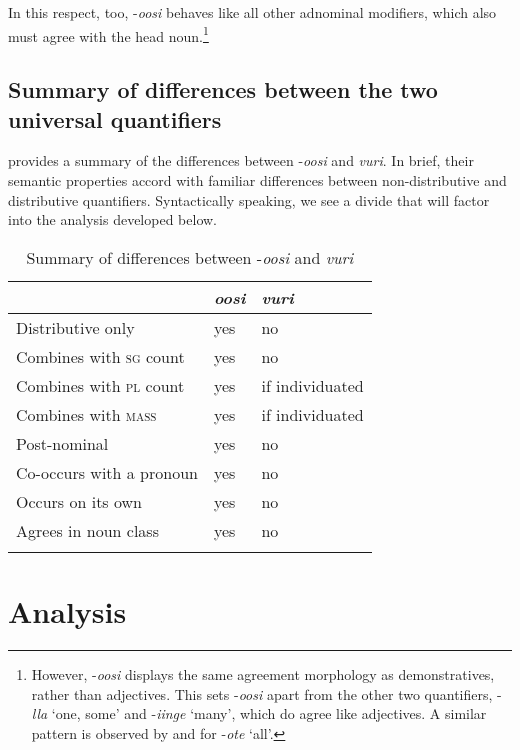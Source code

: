 \documentclass[output=paper]{langsci/langscibook}
\begin{document}
In this respect, too, -\textit{oosi} behaves like all other adnominal modifiers, which also must agree with the head noun.\footnote{However, -\textit{oosi} displays the same agreement morphology as demonstratives, rather than adjectives. This sets -\textit{oosi} apart from the other two  quantifiers, -\textit{lla} ‘one, some’ and -\textit{iinge} ‘many’, which do agree like adjectives. A similar pattern is observed by \citet{Krifka1995} and \citet{ZerbianKrifka2008} for  -\textit{ote} ‘all’.
} 

\subsection{Summary of differences between the two universal quantifiers}

 provides a summary of the differences between -\textit{oosi} and \textit{vuri}. In brief, their semantic properties accord with familiar differences between non-distributive and distributive quantifiers. Syntactically speaking, we see a divide that will factor into the analysis developed below.

\begin{table}
\caption{Summary of differences between -\textit{oosi} and \textit{vuri}}
\label{tab:Landman:2}


\begin{tabularx}{\textwidth}{p{5cm}XX} 
\lsptoprule
& \textit{oosi} &   \textit{vuri}\\
\midrule
{Distributive only}& yes   & no \\
{Combines with \textsc{sg} count}& yes   &  no\\
{Combines with \textsc{pl} count}& yes   & if individuated\\
{Combines with \textsc{mass}}& yes   & if individuated\\
Post-nominal& yes   & no \\
Co-occurs with a pronoun& yes   & no \\
Occurs on its own& yes   & no \\
Agrees in noun class & yes   & no  \\
\lspbottomrule
\end{tabularx}
\end{table}

\section{Analysis}\label{sec:landman:3}
\end{document}
